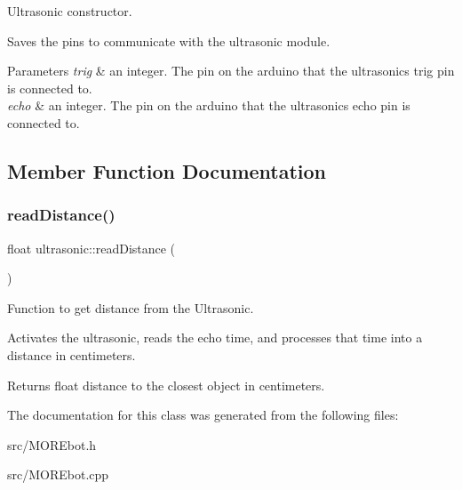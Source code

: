 Ultrasonic constructor. 

Saves the pins to communicate with the ultrasonic module. 
\begin{DoxyParams}{Parameters}
{\em trig} & an integer. The pin on the arduino that the ultrasonic\textquotesingle{}s trig pin is connected to. \\
\hline
{\em echo} & an integer. The pin on the arduino that the ultrasonic\textquotesingle{}s echo pin is connected to. \\
\hline
\end{DoxyParams}


\subsection{Member Function Documentation}
\mbox{\label{classultrasonic_aed6e493e6585def02c351e04bab3e496}} 
\subsubsection{\texorpdfstring{readDistance()}{readDistance()}}
{\footnotesize\ttfamily float ultrasonic\+::read\+Distance (\begin{DoxyParamCaption}{ }\end{DoxyParamCaption})}



Function to get distance from the Ultrasonic. 

Activates the ultrasonic, reads the echo time, and processes that time into a distance in centimeters. \begin{DoxyReturn}{Returns}
float distance to the closest object in centimeters. 
\end{DoxyReturn}


The documentation for this class was generated from the following files\+:\begin{DoxyCompactItemize}
\item 
src/M\+O\+R\+Ebot.\+h\item 
src/M\+O\+R\+Ebot.\+cpp\end{DoxyCompactItemize}
